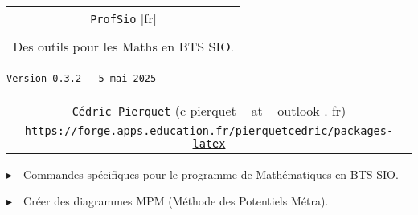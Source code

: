 \documentclass[french,a4paper,11pt]{article}
\def\TPversion{0.3.2}
\def\TPdate{5 mai 2025}
\begin{document}
\setlength{\aweboxleftmargin}{0.07\linewidth}
\setlength{\aweboxcontentwidth}{0.93\linewidth}
\setlength{\aweboxvskip}{8pt}

\pagestyle{fancy}

\thispagestyle{empty}

\vspace{2cm}

\begin{center}
	\begin{minipage}{0.75\linewidth}
	\begin{tcolorbox}[colframe=yellow,colback=yellow!15]
		\begin{center}
			\begin{tabular}{c}
				{\Huge \texttt{ProfSio} [fr]}\\
				\\
				{\LARGE Des outils pour les Maths en BTS SIO.} \\
			\end{tabular}
			
			\bigskip
			
			{\small \texttt{Version \TPversion{} -- \TPdate}}
		\end{center}
	\end{tcolorbox}
\end{minipage}
\end{center}

\begin{center}
	\begin{tabular}{c}
	\texttt{Cédric Pierquet} ({\ttfamily c pierquet -- at -- outlook . fr})\\
	\texttt{\url{https://forge.apps.education.fr/pierquetcedric/packages-latex}}
\end{tabular}
\end{center}

\vspace{0.15cm}

{$\blacktriangleright$~~Commandes spécifiques pour le programme de Mathématiques en BTS SIO\footnotemark{}.}

\vspace{0.15cm}

{$\blacktriangleright$~~Créer des diagrammes MPM\footnotemark{} (Méthode des Potentiels Métra).}
\end{document}
